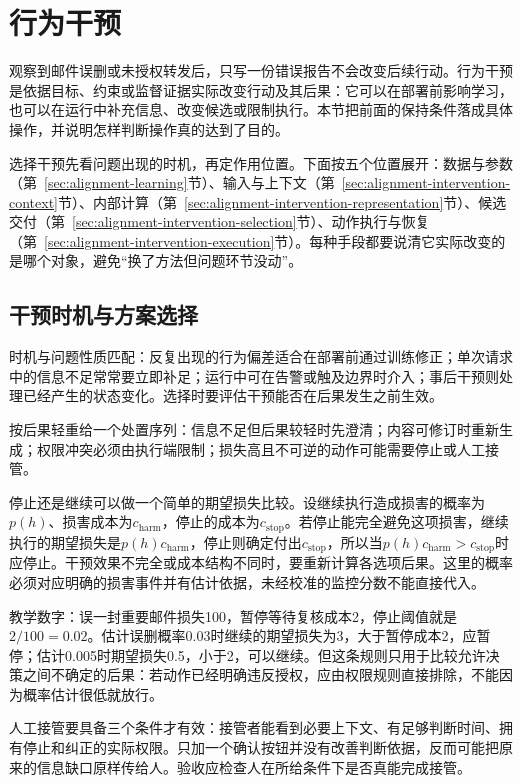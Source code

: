 \section{行为干预}
\label{sec:alignment-intervention}

观察到邮件误删或未授权转发后，只写一份错误报告不会改变后续行动。行为干预是依据目标、约束或监督证据实际改变行动及其后果：它可以在部署前影响学习，也可以在运行中补充信息、改变候选或限制执行。本节把前面的保持条件落成具体操作，并说明怎样判断操作真的达到了目的。

选择干预先看问题出现的时机，再定作用位置。下面按五个位置展开：数据与参数（第~\ref{sec:alignment-learning}节）、输入与上下文（第~\ref{sec:alignment-intervention-context}节）、内部计算（第~\ref{sec:alignment-intervention-representation}节）、候选交付（第~\ref{sec:alignment-intervention-selection}节）、动作执行与恢复（第~\ref{sec:alignment-intervention-execution}节）。每种手段都要说清它实际改变的是哪个对象，避免“换了方法但问题环节没动”。

\subsection{干预时机与方案选择}
\label{sec:alignment-intervention-decision}

时机与问题性质匹配：反复出现的行为偏差适合在部署前通过训练修正；单次请求中的信息不足常常要立即补足；运行中可在告警或触及边界时介入；事后干预则处理已经产生的状态变化。选择时要评估干预能否在后果发生之前生效。

按后果轻重给一个处置序列：信息不足但后果较轻时先澄清；内容可修订时重新生成；权限冲突必须由执行端限制；损失高且不可逆的动作可能需要停止或人工接管。

停止还是继续可以做一个简单的期望损失比较。设继续执行造成损害的概率为$p(h)$、损害成本为$c_{\mathrm{harm}}$，停止的成本为$c_{\mathrm{stop}}$。若停止能完全避免这项损害，继续执行的期望损失是$p(h)c_{\mathrm{harm}}$，停止则确定付出$c_{\mathrm{stop}}$，所以当$p(h)c_{\mathrm{harm}}>c_{\mathrm{stop}}$时应停止。干预效果不完全或成本结构不同时，要重新计算各选项后果。这里的概率必须对应明确的损害事件并有估计依据，未经校准的监控分数不能直接代入。

教学数字：误一封重要邮件损失100，暂停等待复核成本2，停止阈值就是$2/100=0.02$。估计误删概率0.03时继续的期望损失为3，大于暂停成本2，应暂停；估计0.005时期望损失0.5，小于2，可以继续。但这条规则只用于比较允许决策之间不确定的后果：若动作已经明确违反授权，应由权限规则直接排除，不能因为概率估计很低就放行。

人工接管要具备三个条件才有效：接管者能看到必要上下文、有足够判断时间、拥有停止和纠正的实际权限。只加一个确认按钮并没有改善判断依据，反而可能把原来的信息缺口原样传给人。验收应检查人在所给条件下是否真能完成接管。

